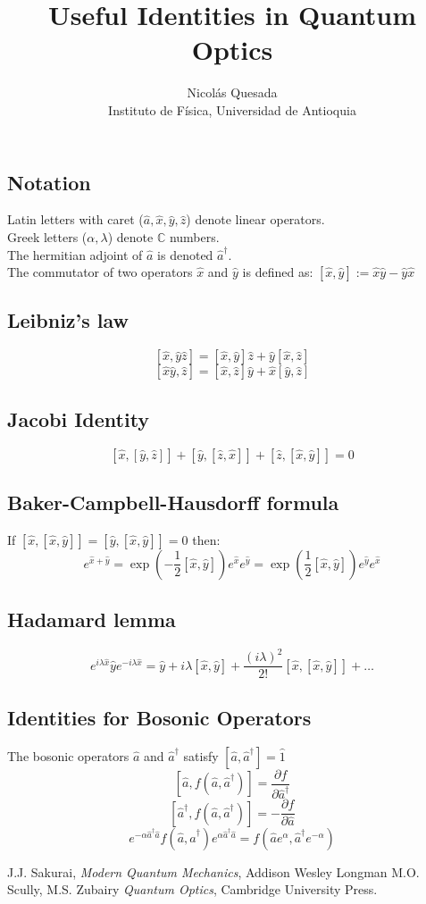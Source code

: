 \documentclass[11pt,letterpaper]{article}
\date{}
\title{Useful Identities in Quantum Optics}
\author{Nicol\'as Quesada\\{\small \sf Instituto de F\'isica, Universidad de Antioquia}}
\begin{document}
\maketitle
\thispagestyle{empty}

\subsection*{Notation}
Latin letters with caret ($\hat a, \hat x, \hat y, \hat z$) denote linear operators.\\
Greek letters ($\alpha, \lambda$) denote $\mathbb{C}$ numbers.\\
The hermitian adjoint of $\hat a$ is denoted $\hat a^{\dagger}$.\\
The commutator of two operators $\hat x$ and $\hat y$ is defined as:
$ [\hat x,\hat y] := \hat x \hat y-\hat y \hat x$ \\

\subsection*{Leibniz's law }
$$ [\hat x, \hat y \hat z]=[\hat x, \hat y] \hat z+\hat y[\hat x,\hat z] $$
$$ [\hat x \hat y, \hat z]=[\hat x, \hat z] \hat y+\hat x[\hat y,\hat z] $$

\subsection*{Jacobi Identity}
$$ [\hat x, [ \hat y, \hat z]]+[ \hat y,[ \hat z,\hat x]]+[\hat z, [\hat x, \hat y]]=0 $$
\subsection*{Baker-Campbell-Hausdorff formula}
If $[\hat x,[\hat x,\hat y]]=[\hat y,[\hat x,\hat y]]=0$ then:
$$e^{\hat x+\hat y}=\exp{\left(-\frac{1}{2} [\hat x,\hat y] \right)} e^{\hat x} e^{\hat y}=\exp{\left(\frac{1}{2} [\hat x,\hat y] \right)} e^{\hat y} e^{\hat x} $$

\subsection*{Hadamard lemma}
$$ e^{ i \lambda \hat x} \hat y e^{- i \lambda \hat x}=\hat y + i \lambda [\hat x,\hat y]+\frac{(i \lambda)^2}{2!}[\hat x,[\hat x,\hat y]]+\ldots$$

\subsection*{Identities for Bosonic Operators}
The bosonic operators $\hat a$ and $\hat a^\dagger$ satisfy $[\hat a,\hat a^\dagger]=\hat 1$
$$[\hat a,f(\hat a,\hat a^\dagger)]=\frac{\partial f}{\partial \hat a^\dagger}$$
$$[\hat a^\dagger,f(\hat a,\hat a^\dagger)]=-\frac{\partial f}{\partial \hat a}$$
$$e^{-\alpha \hat a^\dagger \hat a} f(\hat a,\hat a^\dagger) e^{\alpha \hat a^\dagger \hat a}=f(\hat a e^\alpha,\hat a^\dagger e^{-\alpha})$$

\begin{thebibliography}{}
\bibitem{} J.J. Sakurai, \textit{Modern Quantum Mechanics}, Addison Wesley Longman
\bibitem{} M.O. Scully, M.S. Zubairy \textit{Quantum Optics}, Cambridge University Press.
\end{thebibliography}
\end{document}
